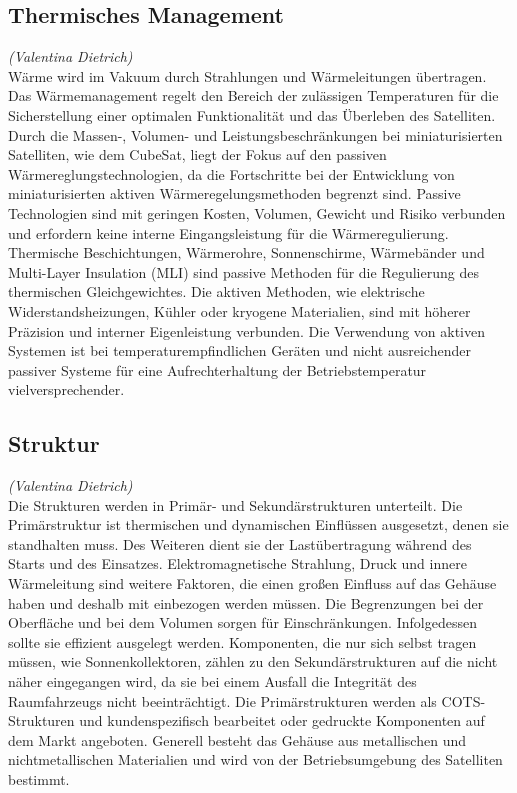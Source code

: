 		\subsection{Thermisches Management}%
		\hfill\emph{(Valentina Dietrich)}\\
		Wärme wird im Vakuum durch Strahlungen und Wärmeleitungen übertragen. Das Wärmemanagement regelt den Bereich der zulässigen Temperaturen für die Sicherstellung einer optimalen Funktionalität und das Überleben des Satelliten. Durch die Massen-, Volumen- und Leistungsbeschränkungen bei miniaturisierten Satelliten, wie dem CubeSat, liegt der Fokus auf den passiven Wärmereglungstechnologien, da die Fortschritte bei der Entwicklung von miniaturisierten aktiven Wärmeregelungsmethoden begrenzt sind. Passive Technologien sind mit geringen Kosten, Volumen, Gewicht und Risiko verbunden und erfordern keine interne Eingangsleistung für die Wärmeregulierung. Thermische Beschichtungen, Wärmerohre, Sonnenschirme, Wärmebänder und Multi-Layer Insulation (MLI) sind passive Methoden für die Regulierung des thermischen Gleichgewichtes. Die aktiven Methoden, wie elektrische Widerstandsheizungen, Kühler oder kryogene Materialien, sind mit höherer Präzision und interner Eigenleistung verbunden. Die Verwendung von aktiven Systemen ist bei temperaturempfindlichen Geräten und nicht ausreichender passiver Systeme für eine Aufrechterhaltung der Betriebstemperatur vielversprechender. \cite[S. 109 - 120]{NASA.Sota.2018} 

		\subsection{Struktur}%
		\hfill\emph{(Valentina Dietrich)}\\
		Die Strukturen werden in Primär- und Sekundärstrukturen unterteilt. Die Primärstruktur ist thermischen und dynamischen Einflüssen ausgesetzt, denen sie standhalten muss. Des Weiteren dient sie der Lastübertragung während des Starts und des Einsatzes. Elektromagnetische Strahlung, Druck und innere Wärmeleitung sind weitere Faktoren, die einen großen Einfluss auf das Gehäuse haben und deshalb mit einbezogen werden müssen. Die Begrenzungen bei der Oberfläche und bei dem Volumen sorgen für Einschränkungen. Infolgedessen sollte sie effizient ausgelegt werden. Komponenten, die nur sich selbst tragen müssen, wie Sonnenkollektoren, zählen zu den Sekundärstrukturen auf die nicht näher eingegangen wird, da sie bei einem Ausfall die Integrität des Raumfahrzeugs nicht beeinträchtigt. Die Primärstrukturen werden als COTS-Strukturen und kundenspezifisch bearbeitet oder gedruckte Komponenten auf dem Markt angeboten. Generell besteht das Gehäuse aus metallischen und nichtmetallischen Materialien und wird von der Betriebsumgebung des Satelliten bestimmt. \cite[S. 96 - 108]{NASA.Sota.2018} 

